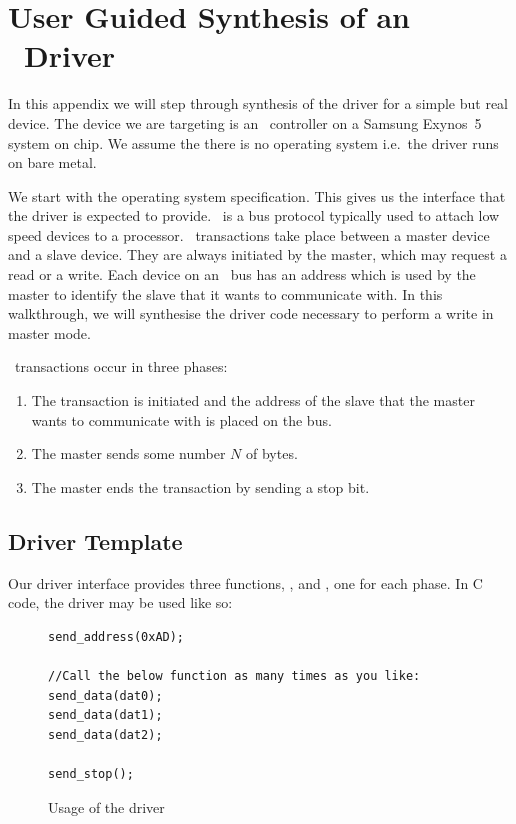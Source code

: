 \chapter{User Guided Synthesis of an \iic\ Driver}
\label{ch:worked_example}

In this appendix we will step through synthesis of the driver for a simple but real device. The device we are targeting is an \iic\ controller on a Samsung Exynos~5 system on chip. We assume the there is no operating system i.e.\ the driver runs on bare metal.

We start with the operating system specification. This gives us the interface that the driver is expected to provide. \iic\ is a bus protocol typically used to attach low speed devices to a processor. \iic\ transactions take place between a master device and a slave device. They are always initiated by the master, which may request a read or a write. Each device on an \iic\ bus has an address which is used by the master to identify the slave that it wants to communicate with. In this walkthrough, we will synthesise the driver code necessary to perform a write in master mode. 

\iic\ transactions occur in three phases:
\begin{enumerate}
    \item The transaction is initiated and the address of the slave that the master wants to communicate with is placed on the bus.
    \item The master sends some number $N$ of bytes.
    \item The master ends the transaction by sending a stop bit.
\end{enumerate}

\section{Driver Template}

Our driver interface provides three functions, ,  and , one for each phase. In C code, the driver may be used like so:
\begin{figure}
\caption{Usage of the \iic driver}
\label{fig:iic_usage}
\begin{lstlisting}[frame=single]
send_address(0xAD);

//Call the below function as many times as you like:
send_data(dat0);
send_data(dat1);
send_data(dat2);

send_stop();
\end{lstlisting}
\end{figure}


